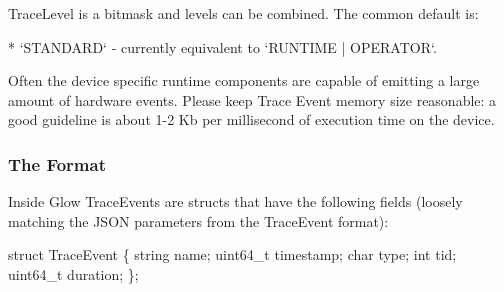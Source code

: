 Trace\+Level is a bitmask and levels can be combined. The common default is\+: \begin{DoxyVerb}* `STANDARD` - currently equivalent to `RUNTIME | OPERATOR`. 
\end{DoxyVerb}


Often the device specific runtime components are capable of emitting a large amount of hardware events. Please keep Trace Event memory size reasonable\+: a good guideline is about 1-\/2 Kb per millisecond of execution time on the device.

\subsubsection*{The Format}

Inside Glow Trace\+Events are structs that have the following fields (loosely matching the J\+S\+ON parameters from the Trace\+Event format)\+:


\begin{DoxyCode}
struct TraceEvent \{
  string name;
  uint64\_t timestamp;
  char type;
  int tid;
  uint64\_t duration;
\};
\end{DoxyCode}



